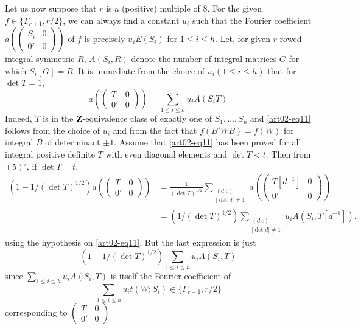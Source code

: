 Let us now suppose that $r$ is a (positive) multiple of 8. For the
given $f\in \{\Gamma_{r+1},r/2\}$, we can always find a constant
$u_{i}$ such that the Fourier coefficient
$a\left(\left(\begin{smallmatrix} S_{i} & 0\\ 0' &
0\end{smallmatrix}\right)\right)$ of $f$ is precisely $u_{i}E(S_{i})$
for $1\leq i\leq h$. Let, for given $r$-rowed integral symmetric $R$,
$A(S_{i},R)$ denote the number of integral matrices $G$ for which
$S_{i}[G]=R$. It is immediate from the choice of $u_{i}(1\leq i\leq
h)$ that for $\det T=1$, 
\begin{equation}
a
\left(
\begin{pmatrix}
T & 0\\
0' & 0
\end{pmatrix}
\right)=\sum_{1\leq i\leq h}u_{i}A(S_{i}T)\label{art02-eq11}
\end{equation}
Indeed, $T$ is in the $\mathbf{Z}$-equivalence class of exactly one of
$S_{1},\ldots,S_{n}$ and \eqref{art02-eq11} follows from the choice of
$u_{i}$ and from the fact that $f(B'WB)=f(W)$ for integral $B$ of
determinant $\pm 1$. Assume that \eqref{art02-eq11} has been proved
for all integral positive definite $T$ with even diagonal elements and
$\det T<t$. Then from $(5)'$, if $\det T=t$, 
{\fontsize{10pt}{12pt}\selectfont
\begin{align*}
(1-1/(\det T)^{1/2})a
\left(
\begin{pmatrix}
T & 0\\
0' & 0
\end{pmatrix}
\right) &= \frac{1}{(\det T)^{1/2}}\sum_{\substack{(d \ c)\\ |\det
d|\neq 1}} a\left(
\begin{pmatrix}
T[d^{-1}] & 0\\
0' & 0
\end{pmatrix}
\right)\\
&= (1/(\det T)^{1/2})\sum_{\substack{(d \ c)\\ |\det d|\neq
1}}u_{i}A(S_{i},T[d^{-1}]). 
\end{align*}}\relax\pageoriginale
using the hypothesis on \eqref{art02-eq11}. But the last expression is
just 
$$
(1-1/(\det T)^{1/2})\sum\limits_{1\leq i\leq h}u_{i}A(S_{i},T)
$$
since $\sum\limits_{1\leq i\leq h}u_{i}A(S_{i},T)$ is itself
the Fourier coefficient of 
$$
\sum\limits_{1\leq i\leq
h}u_{i}t(W;S_{i})\in \{\Gamma_{r+1},r/2\}
$$ 
corresponding to
$\left(\begin{smallmatrix} T & 0\\ 0' & 0\end{smallmatrix}\right)$
